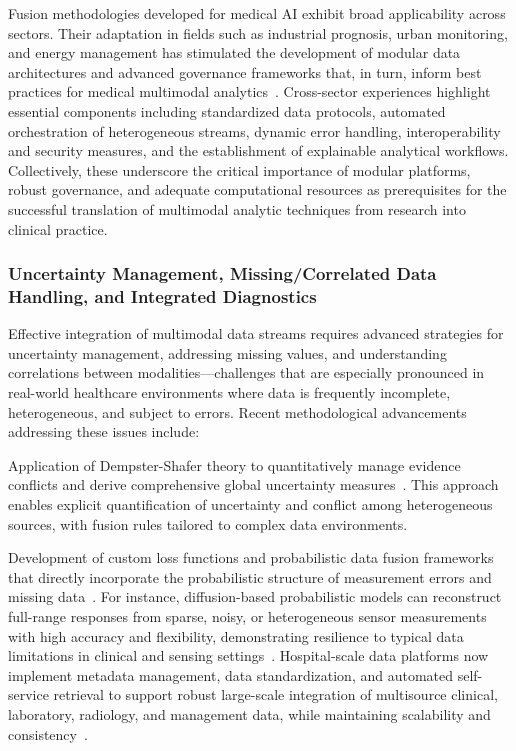 \documentclass[sigconf]{acmart}
\begin{document}
Fusion methodologies developed for medical AI exhibit broad applicability across sectors. Their adaptation in fields such as industrial prognosis, urban monitoring, and energy management has stimulated the development of modular data architectures and advanced governance frameworks that, in turn, inform best practices for medical multimodal analytics~\cite{ref66,ref67,ref68,ref70,ref71,ref72,ref75,ref84}. Cross-sector experiences highlight essential components including standardized data protocols, automated orchestration of heterogeneous streams, dynamic error handling, interoperability and security measures, and the establishment of explainable analytical workflows. Collectively, these underscore the critical importance of modular platforms, robust governance, and adequate computational resources as prerequisites for the successful translation of multimodal analytic techniques from research into clinical practice.

\subsubsection{Uncertainty Management, Missing/Correlated Data Handling, and Integrated Diagnostics}

Effective integration of multimodal data streams requires advanced strategies for uncertainty management, addressing missing values, and understanding correlations between modalities—challenges that are especially pronounced in real-world healthcare environments where data is frequently incomplete, heterogeneous, and subject to errors. Recent methodological advancements addressing these issues include:

Application of Dempster-Shafer theory to quantitatively manage evidence conflicts and derive comprehensive global uncertainty measures~\cite{ref73}. This approach enables explicit quantification of uncertainty and conflict among heterogeneous sources, with fusion rules tailored to complex data environments.

Development of custom loss functions and probabilistic data fusion frameworks that directly incorporate the probabilistic structure of measurement errors and missing data~\cite{ref73,ref76,ref77,ref84}. For instance, diffusion-based probabilistic models can reconstruct full-range responses from sparse, noisy, or heterogeneous sensor measurements with high accuracy and flexibility, demonstrating resilience to typical data limitations in clinical and sensing settings~\cite{ref77}. Hospital-scale data platforms now implement metadata management, data standardization, and automated self-service retrieval to support robust large-scale integration of multisource clinical, laboratory, radiology, and management data, while maintaining scalability and consistency~\cite{ref84}.
\end{document}
